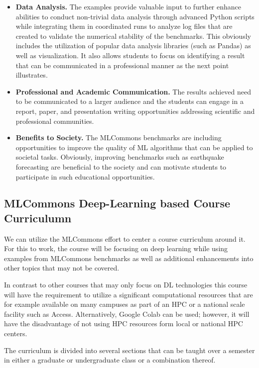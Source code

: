 \documentclass[utf8]{FrontiersinVancouver} %
\begin{document}
{\begin{itemize}
  \item {\bf Data Analysis.} The examples provide valuable input to
    further enhance abilities to conduct non-trivial data analysis
    through advanced Python scripts while integrating them in
    coordinated runs to analyze log files that are created to
    validate the numerical stability of the benchmarks. This obviously
    includes the utilization of popular data analysis libraries (such
    as Pandas) as well as visualization. It also allows students to
    focus on identifying a result that can be communicated in a
    professional manner as the next point illustrates.


  \item {\bf Professional and Academic Communication.} The results
    achieved need to be communicated to a larger audience and the
    students can engage in a report, paper, and
    presentation writing opportunities addressing scientific and
    professional communities.

  \item {\bf Benefits to Society.} The MLCommons benchmarks are
    including opportunities to improve the quality of ML algorithms
    that can be applied to societal tasks. Obviously, improving
    benchmarks such as earthquake forecasting are beneficial to the
    society and can motivate students to participate in such
    educational opportunities.

\end{itemize}


\subsection{MLCommons Deep-Learning based Course Curriculumn}

We can utilize the MLCommons effort to center a course curriculum
around it. For this to work, the course will be focusing on deep
learning while using examples from MLCommons benchmarks as well as
additional enhancements into other topics that may not be covered.

In contrast to other courses that may only focus on DL technologies
this course will have the requirement to utilize a significant
computational resources that are for example available on many
campuses as part of an HPC or a national scale facility such as
Access. Alternatively, Google Colab can be used; however, it will have
the disadvantage of not using HPC resources form local or national HPC
centers.

The curriculum is divided into several sections that can be taught
over a semester in either a graduate or undergraduate class or a
combination thereof.

}
\end{document}
